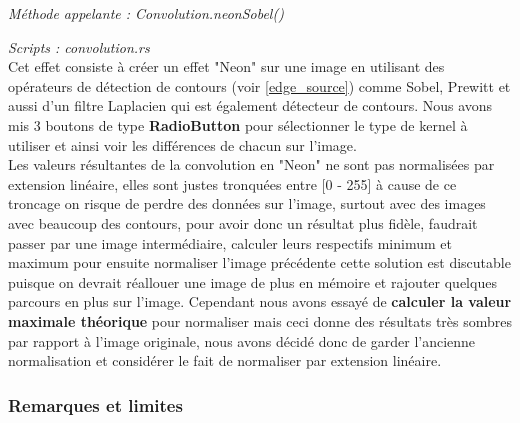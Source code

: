         \emph{Méthode appelante : Convolution.neonSobel()}

        \emph{Scripts : convolution.rs} 
        \\

        Cet effet consiste à créer un effet "Neon" sur une image en utilisant des opérateurs de détection de contours (voir \ref{edge_source}) comme Sobel, Prewitt et aussi d'un filtre Laplacien qui est également détecteur de contours.
        Nous avons mis 3 boutons de type \textbf{RadioButton} pour sélectionner le type de kernel à utiliser et ainsi voir les différences de chacun sur l'image.
        \\
        
        Les valeurs résultantes de la convolution en "Neon" ne sont pas normalisées par extension linéaire, elles sont justes tronquées entre [0 - 255] à cause de ce troncage on risque de perdre des données sur l'image,
         surtout avec des images avec beaucoup des contours, pour avoir donc un résultat plus fidèle, faudrait passer par une image intermédiaire, calculer 
        leurs respectifs minimum et maximum pour ensuite normaliser l'image précédente cette solution est discutable puisque on devrait réallouer une image de plus en mémoire et rajouter quelques parcours en plus sur l'image. Cependant
        nous avons essayé de \textbf{calculer la valeur maximale théorique} pour normaliser mais ceci donne des résultats très sombres par rapport à l'image originale, nous avons décidé donc de garder l'ancienne normalisation et considérer le fait de normaliser par extension linéaire.
        \\

    \subsubsection{Remarques et limites} \label{limits_conv}

